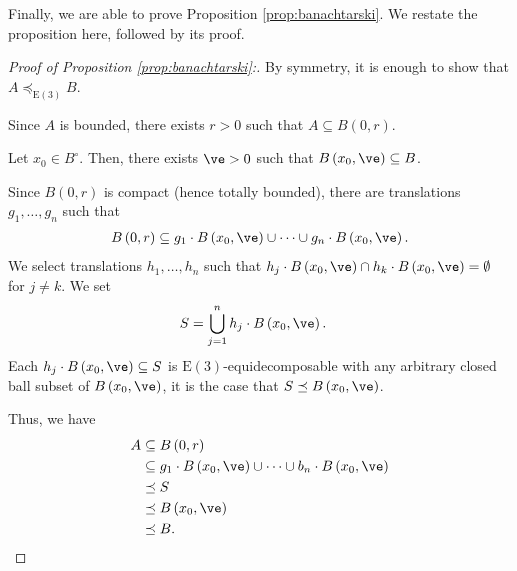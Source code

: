 Finally, we are able to prove Proposition \ref{prop:banachtarski}. We restate the proposition here, followed by its proof.
\banachtarski*
\begin{proof}[Proof of Proposition \ref{prop:banachtarski}:]
  By symmetry, it is enough to show that $A\preceq_{\text{E}(3)} B$.\newline

  Since $A$ is bounded, there exists $r > 0$ such that $A\subseteq B(0,r)$.\newline

  Let $x_0\in B^{\circ}$. Then, there exists $\ve > 0$ such that $B\left(x_0,\ve\right) \subseteq B$.\newline

  Since $B(0,r)$ is compact (hence totally bounded), there are translations $g_1,\dots,g_n$ such that
  \begin{align*}
    B\left(0,r\right) \subseteq g_1\cdot B\left(x_0,\ve\right) \cup \cdots \cup g_n\cdot B\left(x_0,\ve\right).
  \end{align*}
  We select translations $h_1,\dots,h_n$ such that $h_j\cdot B\left(x_0,\ve\right) \cap h_k\cdot B\left(x_0,\ve\right) = \emptyset$ for $j\neq k$. We set
  \begin{align*}
    S &= \bigcup_{j=1}^{n}h_j\cdot B\left(x_0,\ve\right).
  \end{align*}
  Each $h_j\cdot B\left(x_0,\ve\right)\subseteq S$ is $\text{E}(3)$-equidecomposable with any arbitrary closed ball subset of $B\left(x_0,\ve\right)$, it is the case that $S\preceq B\left(x_0,\ve\right)$.\newline

  Thus, we have
  \begin{align*}
    A &\subseteq B\left(0,r\right)\\
      &\subseteq g_1\cdot B\left(x_0,\ve\right)\cup\cdots\cup b_n\cdot B\left(x_0,\ve\right)\\
      &\preceq S\\
      &\preceq B\left(x_0,\ve\right)\\
      &\preceq B.
  \end{align*}
\end{proof}

